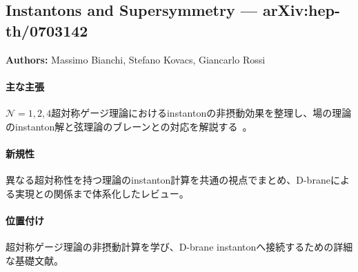 \subsection{Instantons and Supersymmetry --- arXiv:hep-th/0703142}

\textbf{Authors:} Massimo Bianchi, Stefano Kovacs, Giancarlo Rossi

\paragraph{主な主張}
$\mathcal{N}=1,2,4$超対称ゲージ理論におけるinstantonの非摂動効果を整理し、場の理論のinstanton解と弦理論のブレーンとの対応を解説する~\cite{Bianchi:2007ft}。

\paragraph{新規性}
異なる超対称性を持つ理論のinstanton計算を共通の視点でまとめ、D-braneによる実現との関係まで体系化したレビュー。

\paragraph{位置付け}
超対称ゲージ理論の非摂動計算を学び、D-brane instantonへ接続するための詳細な基礎文献。
